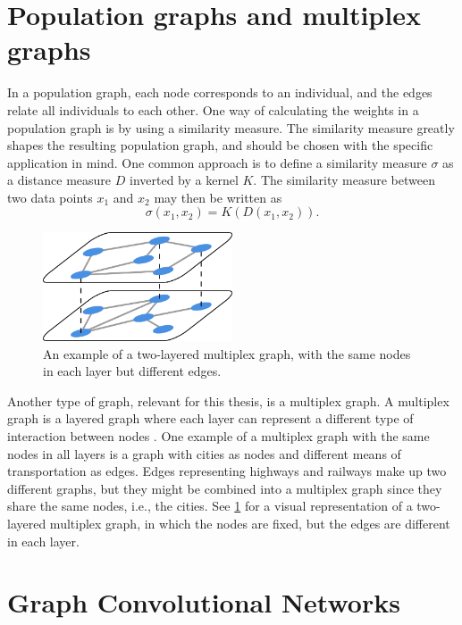 \section{Population graphs and multiplex graphs}
\label{sec:similarity_measure}

In a population graph, each node corresponds to an individual, and the edges relate all individuals to each other. One way of calculating the weights in a population graph is by using a similarity measure. The similarity measure greatly shapes the resulting population graph, and should be chosen with the specific application in mind. One common approach is to define a similarity measure $\sigma$ as a distance measure $D$ inverted by a kernel $K$. The similarity measure between two data points $x_1$ and $x_2$ may then be written as
\begin{equation}
    \sigma(x_1,x_2) = K \left(D\left(x_1, x_2\right) \right).
    \label{eq:similarity_measure}
\end{equation}

\begin{figure}[!htbp]
    \centering
    \includegraphics[width=0.5\textwidth]{chapters/images_theory/multiplex_graph.png}
    \caption{An example of a two-layered multiplex graph, with the same nodes in each layer but different edges.}
    \label{fig:multiplex_graph}
\end{figure}
Another type of graph, relevant for this thesis, is a multiplex graph. A multiplex graph is a layered graph where each layer can represent a different type of interaction between nodes \cite{multiplex_book_chap2}. One example of a multiplex graph with the same nodes in all layers is a graph with cities as nodes and different means of transportation as edges. Edges representing highways and railways make up two different graphs, but they might be combined into a multiplex graph since they share the same nodes, i.e., the cities. See \cref{fig:multiplex_graph} for a visual representation of a two-layered multiplex graph, in which the nodes are fixed, but the edges are different in each layer.

\section{Graph Convolutional Networks}
\label{sec:gcn}

